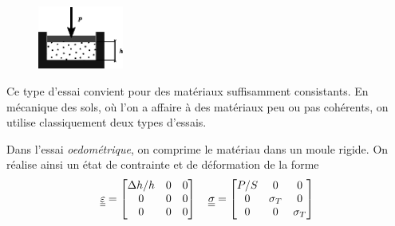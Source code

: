 \begin{figure}
    \begin{center}
        \vspace*{-5pt}
        \includegraphics[width=2.8cm]{../images/T1_Ch04-0009}
    \end{center}
    \vspace*{5pt}
\end{figure}
Ce type d'essai convient pour des matériaux suffisamment consistants.
En mécanique des sols, où l'on a affaire à des matériaux peu ou pas cohérents, on utilise classiquement deux types d'essais.

Dans l'essai \emph{oedométrique}, on comprime le matériau dans un moule rigide.
On réalise ainsi un état de contrainte et de déformation de la forme
\begin{equation}
    \underline{\underline{\varepsilon}} =
    \begin{bmatrix}
        \Delta h/h & 0 & 0 \\
        0 & 0 & 0 \\
        0 & 0 & 0
    \end{bmatrix}
    \quad
    \underline{\underline{\sigma}} = 
    \begin{bmatrix}
        P/S & 0 & 0 \\
        0 & \sigma_T & 0 \\
        0 & 0 & \sigma_T
    \end{bmatrix}
    \label{eq:Ch04-037}
\end{equation}

